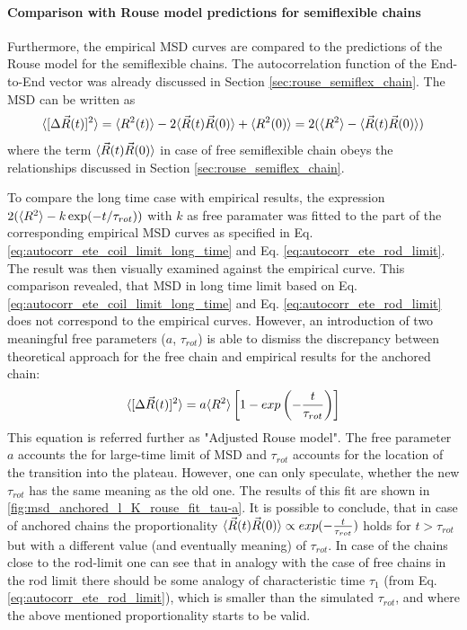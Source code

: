 \documentclass[
    paper=A4,pagesize=automedia,fontsize=12pt,
    BCOR=15mm,DIV=22,
    twoside,headinclude,footinclude=false,
    fleqn,             %
    bibliography=totocnumbered,          %
    listof=totoc,                %
    listof=flat,                 %
    cleardoublepage=empty      %
    numbers=endperiod
]{scrartcl}
\begin{document}
\FloatBarrier

\paragraph{Comparison with Rouse model predictions for semiflexible chains}
\label{sec:comp_with_rouse_semiflex}

Furthermore, the empirical MSD curves are compared to the predictions
of the Rouse model for the semiflexible chains. The autocorrelation function
of the End-to-End vector was already discussed in Section \ref{sec:rouse_semiflex_chain}.
The MSD can be written as 
$$\langle[\Delta \vec{R}(t)]^2\rangle = \langle R^2(t)\rangle - 2 \langle\vec{R}(t)\vec{R}(0)\rangle + \langle R^2(0)\rangle = 2(\langle R^2\rangle - \langle\vec{R}(t)\vec{R}(0)\rangle)$$
where the term $\langle\vec{R}(t)\vec{R}(0)\rangle$ in case of free semiflexible chain obeys 
the relationships discussed in Section \ref{sec:rouse_semiflex_chain}.

To compare the long time case with empirical results, the expression
$2(\langle R^2\rangle - k \exp(-t/\tau_{rot}))$ with $k$ as free paramater was fitted 
to the part of the corresponding empirical MSD curves as specified in 
Eq. \ref{eq:autocorr_ete_coil_limit_long_time} and Eq. \ref{eq:autocorr_ete_rod_limit}.
The result was then visually examined against the empirical curve.
This comparison revealed, that MSD in long time limit based on 
Eq. \ref{eq:autocorr_ete_coil_limit_long_time} and 
Eq. \ref{eq:autocorr_ete_rod_limit} does not correspond to the empirical curves.
However, an introduction of two meaningful free parameters 
($a$, $\tau_{rot}$) is able to dismiss
the discrepancy between theoretical approach for the free chain and empirical 
results for the anchored chain:
\begin{equation}
    \label{eq:adjusted_rouse_model_ete}
    \langle[\Delta \vec{R}(t)]^2\rangle  = a\langle R^2\rangle\left[1 - exp\left(-\frac{t}{\tau_{rot}}\right)\right]
\end{equation}
This equation is referred further as "Adjusted Rouse model".
The free parameter $a$ accounts the for large-time limit of MSD and $\tau_{rot}$ 
accounts for the location of the transition into the plateau. However, one
can only speculate, whether the new $\tau_{rot}$ has the same meaning
as the old one. The results of this fit are shown in 
\autoref{fig:msd_anchored_l_K_rouse_fit_tau-a}.
It is possible to conclude, that in case of anchored chains the proportionality
$\langle\vec{R}(t)\vec{R}(0)\rangle \propto exp(-\frac{t}{\tau_{rot}})$
holds for $t>\tau_{rot}$ but with a different value (and eventually meaning) of $\tau_{rot}$.
In case of the chains close to the rod-limit one can see that in analogy with 
the case of free chains in the rod limit there should be some analogy of 
characteristic time $\tau_1$ (from Eq. \ref{eq:autocorr_ete_rod_limit}), which 
is smaller than the simulated $\tau_{rot}$, and where the above mentioned 
proportionality starts to be valid.
\end{document}
